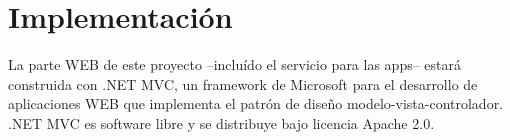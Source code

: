 \chapter{Implementación}

La parte WEB de este proyecto  --incluído el servicio para las apps-- estará construida con .NET MVC, un framework de Microsoft para el desarrollo de aplicaciones WEB que implementa el patrón de diseño modelo-vista-controlador. .NET MVC es software libre y se distribuye bajo licencia Apache 2.0.